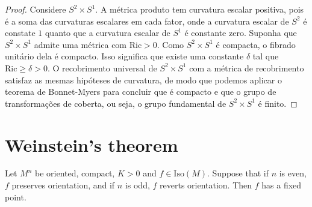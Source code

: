 \begin{proof}
Considere $S^2\times S^1$. A métrica produto tem curvatura escalar positiva,
pois é a soma das curvaturas escalares em cada fator, onde a curvatura escalar
de $S^2$ é constate $1$ quanto que a curvatura escalar de $S^1$ é constante
zero. Suponha que $S^2\times S^1$ admite uma métrica com $\text{Ric}>0$. Como
$S^2\times S^1$ é compacta, o fibrado unitário dela é compacto. Isso significa
que existe uma constante $\delta$ tal que $\text{Ric}\geq \delta>0$. O 
recobrimento universal de $S^2 \times S^1$ com a métrica de 
recobrimento satisfaz as mesmas hipóteses de curvatura, de modo que podemos
aplicar o teorema de Bonnet-Myers para concluir que é compacto e que o grupo de
transformações de coberta, ou seja, o grupo fundamental de $S^2\times S^1$ é
finito. 
\end{proof}

\section{Weinstein's theorem}
\label{section-Weinstein-theorem}

\begin{theorem}[Weinstein]
\label{theorem-Weinstein}
Let $M^n$ be oriented, compact, $K>0$ and $f \in \text{Iso}(M)$. Suppose that 
if $n$ is even, $f$ preserves orientation, and if $n$ is odd, $f$ reverts
orientation. Then $f$ has a fixed point.
\end{theorem}

